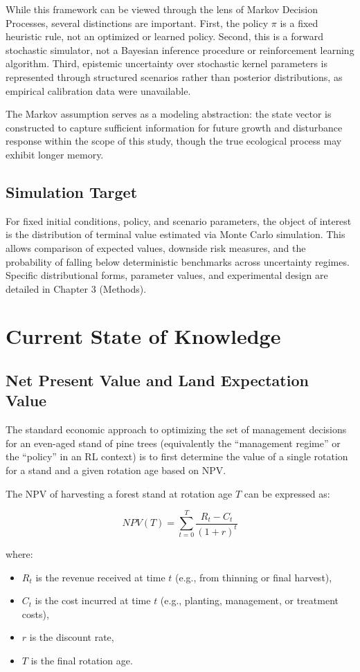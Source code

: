 \documentclass[12pt]{report}
\begin{document}
While this framework can be viewed through the lens of Markov Decision Processes, several distinctions are important. First, the policy $\pi$ is a fixed heuristic rule, not an optimized or learned policy. Second, this is a forward stochastic simulator, not a Bayesian inference procedure or reinforcement learning algorithm. Third, epistemic uncertainty over stochastic kernel parameters is represented through structured scenarios rather than posterior distributions, as empirical calibration data were unavailable.

The Markov assumption serves as a modeling abstraction: the state vector is constructed to capture sufficient information for future growth and disturbance response within the scope of this study, though the true ecological process may exhibit longer memory.

\subsection{Simulation Target}

For fixed initial conditions, policy, and scenario parameters, the object of interest is the distribution of terminal value estimated via Monte Carlo simulation. This allows comparison of expected values, downside risk measures, and the probability of falling below deterministic benchmarks across uncertainty regimes. Specific distributional forms, parameter values, and experimental design are detailed in Chapter 3 (Methods).

\section{Current State of Knowledge}
\subsection{Net Present Value and Land Expectation Value}
The standard economic approach to optimizing the set of management decisions for an even-aged stand of pine trees (equivalently the ``management regime'' or the ``policy'' in an RL context) is to first determine the value of a single rotation for a stand and a given rotation age based on NPV.

The NPV of harvesting a forest stand at rotation age $T$ can be expressed as:

\[
NPV(T) = \sum_{t=0}^{T} \frac{R_t - C_t}{(1 + r)^t}
\]

where:
\begin{itemize}
    \item $R_t$ is the revenue received at time $t$ (e.g., from thinning or final harvest),
    \item $C_t$ is the cost incurred at time $t$ (e.g., planting, management, or treatment costs),
    \item $r$ is the discount rate,
    \item $T$ is the final rotation age.
\end{itemize}
\end{document}
